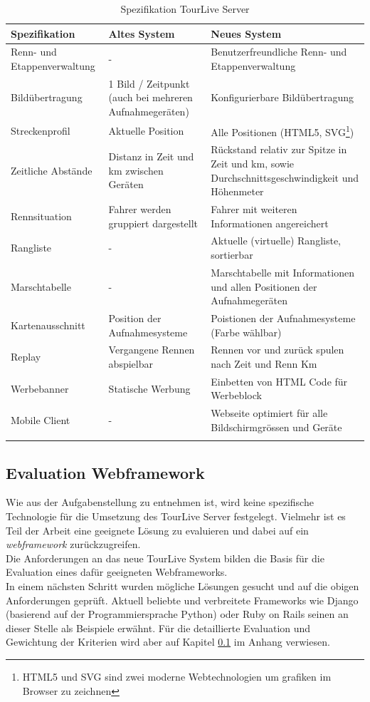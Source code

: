 \begin{longtable}{ p{3.5cm} | p{4.3cm} | p{4.3cm} }
	\textbf{Spezifikation} & \textbf{Altes System} & \textbf{Neues System} \\ \hline\hline Renn- und Etappenverwaltung & - & Benutzerfreundliche Renn- und Etappenverwaltung\\ \hline
Bildübertragung & 1 Bild / Zeitpunkt (auch bei mehreren Aufnahmegeräten) & Konfigurierbare Bildübertragung\\ \hline
Streckenprofil & Aktuelle Position & Alle Positionen (HTML5, SVG\footnote{HTML5 und SVG sind zwei moderne Webtechnologien um grafiken im Browser zu zeichnen})\\ \hline
Zeitliche Abstände & Distanz in Zeit und km zwischen Geräten & Rückstand relativ zur Spitze in Zeit und km, sowie Durchschnittsgeschwindigkeit und Höhenmeter\\ \hline
Rennsituation & Fahrer werden gruppiert dargestellt & Fahrer mit weiteren Informationen angereichert\\ \hline
Rangliste & - & Aktuelle (virtuelle) Rangliste, sortierbar\\ \hline
Marschtabelle & - & Marschtabelle mit Informationen und allen Positionen der Aufnahmegeräten\\ \hline
Kartenausschnitt & Position der Aufnahmesysteme & Poistionen der Aufnahmesysteme (Farbe wählbar)\\ \hline
Replay & Vergangene Rennen abspielbar & Rennen vor und zurück spulen nach Zeit und Renn Km\\ \hline
Werbebanner & Statische Werbung & Einbetten von HTML Code für Werbeblock\\ \hline
Mobile Client & - & Webseite optimiert für alle Bildschirmgrössen und Geräte\\ \hline

\caption{Spezifikation TourLive Server}
\label{tab:tourlivewebspeztable}
\end{longtable}

\subsection{Evaluation Webframework}
\label{sec:evaluationwebframework}
Wie aus der Aufgabenstellung zu entnehmen ist, wird keine spezifische Technologie für die Umsetzung des TourLive Server festgelegt. Vielmehr ist es Teil der Arbeit eine geeignete Lösung zu evaluieren und dabei auf ein \textit{\gls{webframework}} zurückzugreifen.\\
Die Anforderungen an das neue TourLive System bilden die Basis für die Evaluation eines dafür geeigneten Webframeworks.
\\
In einem nächsten Schritt wurden mögliche Lösungen gesucht und auf die obigen Anforderungen geprüft. Aktuell beliebte und verbreitete Frameworks wie Django (basierend auf der Programmiersprache Python) oder Ruby on Rails seinen an dieser Stelle als Beispiele erwähnt. Für die detaillierte Evaluation und Gewichtung der Kriterien wird aber auf Kapitel \ref{sec:evaluationwebframework} im Anhang verwiesen.

